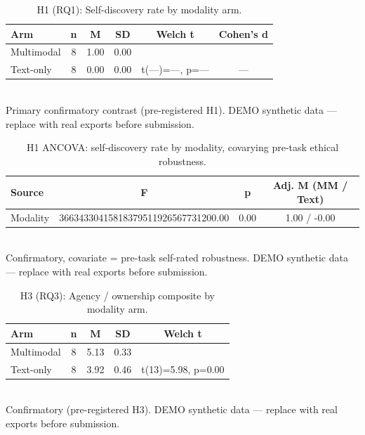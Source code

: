 
\begin{table}[t]
  \centering
  \caption{H1 (RQ1): Self-discovery rate by modality arm.}
  \begin{tabular}{l c c c c c}
    \toprule
    Arm & n & M & SD & Welch t & Cohen's d \\
    \midrule
    Multimodal & 8 & 1.00 & 0.00 &  &  \\
    Text-only & 8 & 0.00 & 0.00 & t(—)=—, p=— & — \\
    \bottomrule
  \end{tabular}
  \label{tab:h1}
  \\ \footnotesize Primary confirmatory contrast (pre-registered H1). DEMO synthetic data — replace with real exports before submission.
\end{table}


\begin{table}[t]
  \centering
  \caption{H1 ANCOVA: self-discovery rate by modality, covarying pre-task ethical robustness.}
  \begin{tabular}{l c c c}
    \toprule
    Source & F & p & Adj. M (MM / Text) \\
    \midrule
    Modality & 36634330415818379511926567731200.00 & 0.00 & 1.00 / -0.00 \\
    \bottomrule
  \end{tabular}
  \label{tab:h1ancova}
  \\ \footnotesize Confirmatory, covariate = pre-task self-rated robustness. DEMO synthetic data — replace with real exports before submission.
\end{table}


\begin{table}[t]
  \centering
  \caption{H3 (RQ3): Agency / ownership composite by modality arm.}
  \begin{tabular}{l c c c c}
    \toprule
    Arm & n & M & SD & Welch t \\
    \midrule
    Multimodal & 8 & 5.13 & 0.33 &  \\
    Text-only & 8 & 3.92 & 0.46 & t(13)=5.98, p=0.00 \\
    \bottomrule
  \end{tabular}
  \label{tab:h3}
  \\ \footnotesize Confirmatory (pre-registered H3). DEMO synthetic data — replace with real exports before submission.
\end{table}


